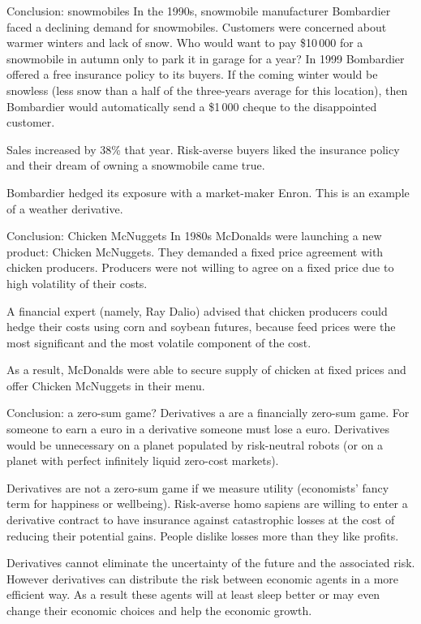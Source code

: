 \documentclass{beamer}
\begin{document}
\begin{frame}{Conclusion: snowmobiles}
\justify
 In  the 1990s, snowmobile manufacturer Bombardier faced a declining demand for snowmobiles. Customers were concerned about warmer winters and lack of snow.  Who would want to pay \$10\,000 for a snowmobile in autumn only to park it in garage for a year?
\justify
In 1999 Bombardier offered a free insurance policy to its buyers. If the coming winter would be snowless (less snow than a half of the three-years average for this location), then Bombardier would automatically send a \$1\,000 cheque to the disappointed customer.

\justify
Sales increased by 38\% that year. Risk-averse buyers liked the insurance policy and their dream of owning a snowmobile came true.

\justify
Bombardier hedged its exposure with a market-maker Enron. This is an example of a weather derivative.
\end{frame}




\begin{frame}{Conclusion: Chicken McNuggets}
\justify
In 1980s McDonalds were launching a new product: Chicken McNuggets. They demanded a fixed price agreement  with chicken producers. Producers were not willing to agree on a fixed price due to high volatility of their costs.

\justify
A financial expert (namely, Ray Dalio) advised that chicken producers could hedge their costs using corn and soybean futures, because feed prices were the most significant and the most volatile component of the cost.

\justify
As a result, McDonalds were able to secure supply of chicken at fixed prices and offer Chicken McNuggets in their menu. 
\end{frame}



\begin{frame}{Conclusion: a zero-sum game?}
\justify
Derivatives a are a \alert{financially} zero-sum game. For someone to earn a euro in a derivative someone must lose a euro. Derivatives would be unnecessary on a planet populated by risk-neutral robots (or on a planet with perfect infinitely liquid zero-cost markets).

\justify
Derivatives are not a zero-sum game if we measure \alert{utility} (economists' fancy term for happiness or wellbeing).  Risk-averse homo sapiens are willing to enter a derivative contract to have insurance against catastrophic losses at the cost of reducing their potential gains. People dislike losses more than they like profits. 

\justify
Derivatives cannot eliminate the uncertainty of the future and the associated risk. However derivatives can distribute the risk between economic agents in a more efficient way. As a result these agents will at least sleep better or may even change their economic choices and help the economic growth.
\end{frame}
\end{document}
